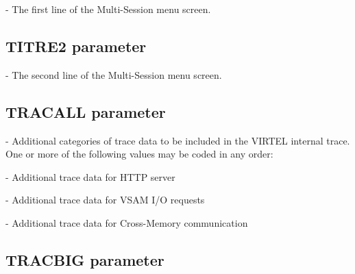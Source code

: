 \documentclass[letterpaper,10pt,english]{sphinxmanual}
\begin{document}
 - The first line of the Multi-Session menu screen.


\subsection{TITRE2 parameter}
\label{\detokenize{Installation_Guide:titre2-parameter}}
\begin{sphinxVerbatim}[commandchars=\\\{\}]
 
\end{sphinxVerbatim}

 - The second line of the Multi-Session menu screen.

\ignorespaces 

\subsection{TRACALL parameter}
\label{\detokenize{Installation_Guide:tracall-parameter}}\label{\detokenize{Installation_Guide:index-126}}
\begin{sphinxVerbatim}[commandchars=\\\{\}]
 
\end{sphinxVerbatim}

 - Additional categories of trace data to be included in the VIRTEL internal trace. One or more of the following values may be coded in any order:

 - Additional trace data for HTTP server

 - Additional trace data for VSAM I/O requests

 - Additional trace data for Cross-Memory communication

\ignorespaces 

\subsection{TRACBIG parameter}
\label{\detokenize{Installation_Guide:tracbig-parameter}}\label{\detokenize{Installation_Guide:index-127}}
\begin{sphinxVerbatim}[commandchars=\\\{\}]
 
\end{sphinxVerbatim}
\end{document}

